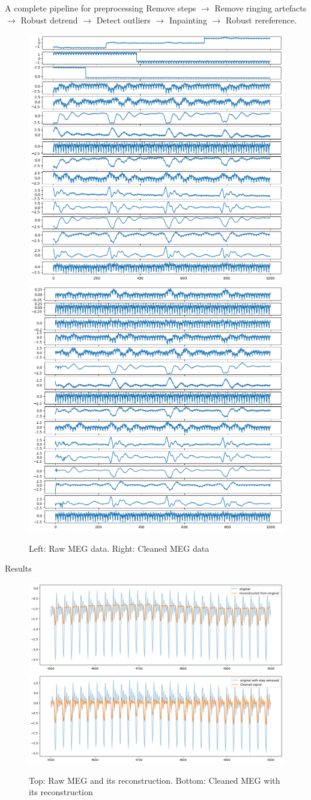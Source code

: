 \documentclass[10pt,serif]{beamer}
\begin{document}
\begin{frame}{A complete pipeline for preprocessing}
    Remove steps \(\to\) Remove ringing artefacts \(\to\) Robust detrend \(\to\) Detect outliers \(\to\) Inpainting \(\to\) Robust rereference.
    \begin{figure}
        \centering
        \includegraphics[width=.4\textwidth]{figures/data_raw.png}
        \includegraphics[width=.4\textwidth]{figures/data_clean.png}
        \caption{Left: Raw MEG data. Right: Cleaned MEG data}
        \label{fig:data}
    \end{figure}
\end{frame}

\begin{frame}{Results}
    \begin{figure}
        \centering
        \includegraphics[width=.65\textwidth]{figures/recons}\\
        \includegraphics[width=.65\textwidth]{figures/recons_clean}
        \caption{Top: Raw MEG and its reconstruction. Bottom: Cleaned MEG with its reconstruction}
        \label{fig:recons}
    \end{figure}
\end{frame}
\end{document}
